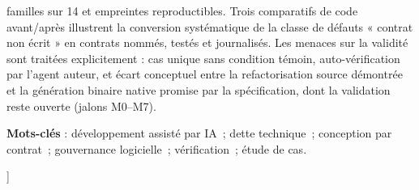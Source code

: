 \documentclass[10pt,a4paper,twocolumn]{article}
\theoremstyle{definition}
\theoremstyle{plain}
\begin{document}
{\begin{center}
\begin{minipage}{0.88\textwidth}
  familles sur 14 et empreintes reproductibles. Trois comparatifs de code
  avant/après illustrent la conversion systématique de la classe de défauts
  « contrat non écrit » en contrats nommés, testés et journalisés. Les menaces
  sur la validité sont traitées explicitement : cas unique sans condition
  témoin, auto-vérification par l’agent auteur, et écart conceptuel entre la
  refactorisation source démontrée et la génération binaire native promise par
  la spécification, dont la validation reste ouverte (jalons M0–M7).
  \par\vspace{5pt}
  \textbf{Mots-clés} : développement assisté par IA~; dette technique~;
  conception par contrat~; gouvernance logicielle~; vérification~;
  étude de cas.
\end{minipage}
\end{center}
\vspace{16pt}
}]










\end{document}
